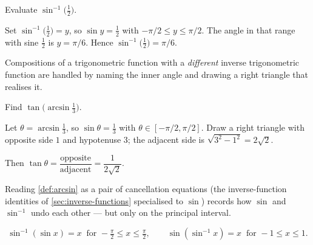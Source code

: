 \begin{workedexample}
\begin{example}\label{ex:arcsin-half}
Evaluate \(\sin^{-1}\!\bigl(\tfrac{1}{2}\bigr)\).
\end{example}

\begin{solution}
Set \(\sin^{-1}\!\bigl(\tfrac{1}{2}\bigr) = y\), so \(\sin y = \tfrac{1}{2}\) with \(-\pi/2 \le y \le \pi/2\). The angle in that range with sine \(\tfrac{1}{2}\) is \(y = \pi/6\). Hence \(\sin^{-1}\!\bigl(\tfrac{1}{2}\bigr) = \pi/6\).
\end{solution}
\end{workedexample}

Compositions of a trigonometric function with a \emph{different} inverse trigonometric function are handled by naming the inner angle and drawing a right triangle that realises it.

\begin{workedexample}
\begin{example}\label{ex:tan-arcsin}
Find \(\tan\!\bigl(\arcsin \tfrac{1}{3}\bigr)\).
\end{example}

\begin{solution}
Let \(\theta = \arcsin \tfrac{1}{3}\), so \(\sin \theta = \tfrac{1}{3}\) with \(\theta \in [-\pi/2, \pi/2]\). Draw a right triangle with opposite side \(1\) and hypotenuse \(3\); the adjacent side is \(\sqrt{3^{2} - 1^{2}} = 2\sqrt{2}\).
\begin{center}
\end{center}
Then \(\tan \theta = \dfrac{\text{opposite}}{\text{adjacent}} = \dfrac{1}{2\sqrt{2}}\).
\end{solution}
\end{workedexample}

Reading \cref{def:arcsin} as a pair of cancellation equations (the inverse-function identities of \cref{sec:inverse-functions} specialised to \(\sin\)) records how \(\sin\) and \(\sin^{-1}\) undo each other --- but only on the principal interval.

\begin{proposition}\label{prop:arcsin-cancellation}
\[
\sin^{-1}(\sin x) = x \ \text{ for } -\tfrac{\pi}{2} \le x \le \tfrac{\pi}{2},
\qquad
\sin(\sin^{-1} x) = x \ \text{ for } -1 \le x \le 1.
\]
\end{proposition}


